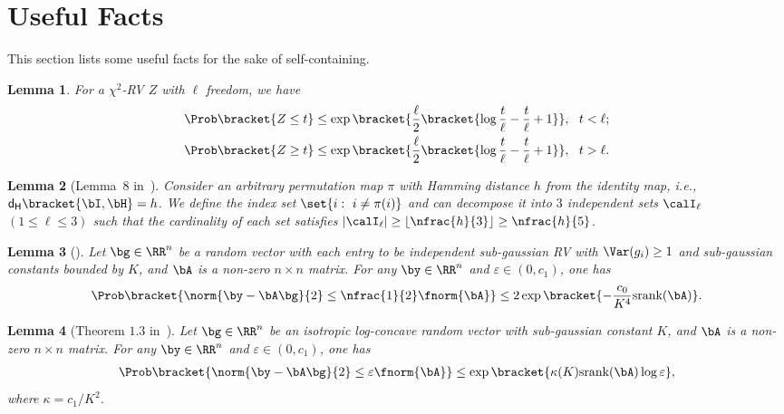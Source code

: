 \documentclass[11pt]{article}
\newtheorem{lemma}{Lemma}
\def \dh {\mathsf{d_H}}
\def\srank#1{\textup{srank}(#1)}
\begin{document}
\section{Useful Facts}
This section lists some useful
facts for the sake of self-containing.

\begin{lemma}
\label{lemma:chi_square}
For a $\chi^2$-RV $Z$ with $\ell$ freedom, we have
\begin{align*}
\Prob\bracket{Z\leq t} \leq \exp\bracket{\frac{\ell}{2}\bracket{\log \frac{t}{\ell} - \frac{t}{\ell} + 1}},~~t < \ell;  \\
\Prob\bracket{Z\geq t} \leq \exp\bracket{\frac{\ell}{2}\bracket{\log \frac{t}{\ell} - \frac{t}{\ell} + 1}},~~ t >  \ell.
\end{align*}
\end{lemma}


\begin{lemma}[Lemma~$8$ in~\citet{pananjady2018linear}]
\label{lemma:permute_decomp}
Consider an arbitrary permutation map $\pi$
with Hamming distance $h$ from the
identity map, i.e., $\dh\bracket{\bI, \bH} = h$.
We define the index
set $\set{i:~i\neq \pi(i)}$ and can
decompose it into $3$ independent
sets $\calI_{\ell}$ $(1\leq \ell \leq 3)$ such that
the cardinality of each set satisfies
$|\calI_{\ell}|\geq \lfloor \nfrac{h}{3}\rfloor \geq \nfrac{h}{5}$.
\end{lemma}


\begin{lemma}[\cite{latala2007banach}]
\label{lemma:small_ball_subgauss}
Let $\bg \in \RR^n$ be a random vector with
each entry to be independent sub-gaussian RV with
$\Var(g_i) \geq 1$ and sub-gaussian constants
bounded by $K$, and $\bA$ is a non-zero
$n\times n$ matrix. For any $\by\in \RR^n$ and
$\varepsilon\in (0, c_1)$, one has
\begin{align*}
\Prob\bracket{\norm{\by - \bA\bg}{2} \leq \nfrac{1}{2}\fnorm{\bA}}
\leq 2\exp\bracket{-\frac{c_0}{K^4}\srank{\bA} }.
\end{align*}
\end{lemma}


\begin{lemma}[Theorem $1.3$ in~\citet{paouris2012small}]
\label{lemma:small_ball_log_concave}
Let $\bg \in \RR^n$ be an isotropic log-concave random vector
with sub-gaussian constant $K$, and $\bA$ is a non-zero
$n\times n$ matrix. For any $\by\in \RR^n$ and
$\varepsilon\in (0, c_1)$, one has
\begin{align*}
\Prob\bracket{\norm{\by - \bA\bg}{2} \leq \varepsilon \fnorm{\bA}}
\leq \exp\bracket{\kappa(K)\srank{\bA}\log \varepsilon },
\end{align*}
where $\kappa = c_1/K^2$. 	
\end{lemma}
\end{document}
